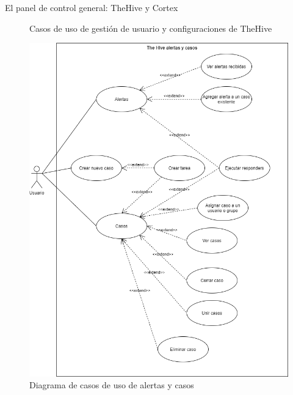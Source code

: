 \begin{section}{El panel de control general: TheHive y Cortex}
\begin{figure}[H]
        \caption{Casos de uso de gestión de usuario y configuraciones de TheHive}
        \label{fig:caso_de_uso_gestion_usuario_conf_thehive}
     \end{figure}
     \begin{figure}[H]
        \centering
        \includegraphics[width=1\textwidth]{./iteracion_1_imagenes/figura_29_thehive_alertas_casos.png}
        \caption{Diagrama de casos de uso de alertas y casos}
        \label{fig:caso_de_uso_alertas_casos}
     \end{figure}
     \begin{figure}[H]
        \centering

\end{figure}
\end{section}

